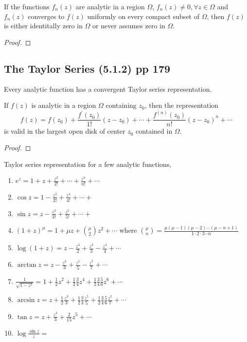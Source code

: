 \begin{theorem}[Hurwitz]
	If the functions $f_n(z)$ are analytic in a region $\Omega$, $f_n(z) \ne 0, \forall z \in \Omega$ and $f_n(z)$ converges to $f(z)$ uniformly on every compact subset of $\Omega$, then $f(z)$ is either identitally zero in $\Omega$ or never assumes zero in $\Omega$.
\end{theorem}
\begin{proof}
\end{proof}
	
\subsection{The Taylor Series (5.1.2) pp 179}
\begin{important}
	Every analytic function has a convergent Taylor series representation.
\end{important}
\begin{theorem}
	If $f(z)$ is analytic in a region $\Omega$ containing $z_0$, then the representation
	\begin{equation}
		f(z) = f(z_0) + \frac{f^\prime(z_0)}{1!}(z-z_0) + \dotsb + \frac{f^{(n)}(z_0)}{n!}(z-z_0)^n + \dotsb
	\end{equation}
	is valid in the largest open disk of center $z_0$ contained in $\Omega$.
\end{theorem}
\begin{proof}
\end{proof}

Taylor series representation for a few analytic functions,
\begin{enumerate}
	\item $e^z = 1 + z + \frac{z^2}{2!} + \dotsb + \frac{z^n}{n!} + \dotsb$
	\item $\cos z = 1 - \frac{z^2}{2!} + \frac{z^4}{4!} + \dotsb + $
	\item $\sin z = z - \frac{z^3}{3!} + \frac{z^5}{5!} + \dotsb + $
	\item $(1+z)^\mu = 1 + \mu z + \binom{\mu}{2} z^2 + \dotsb$ where $\binom{\mu}{n} = \frac{\mu(\mu-1)(\mu-2) \dotsm (\mu-n+1)}{1 \cdot 2 \cdot 3 \dotsm n}$
	\item $\log (1+z) = z - \frac{z^2}{2} + \frac{z^3}{3} - \frac{z^4}{4} + \dotsb$
	\item $\arctan z = z - \frac{z^3}{3} + \frac{z^5}{5} - \frac{z^7}{7} + \dotsb$
	\item $\frac{1}{\sqrt{1-z^2}} = 1 + \frac{1}{2}z^2 + \frac{1}{2}\frac{3}{4} z^4 + \frac{1}{2} \frac{3}{4} \frac{5}{6} z^6 + \dotsb$ 
	\item $\arcsin z = z + \frac{1}{2} \frac{z^3}{3} + \frac{1}{2} \frac{3}{4} \frac{z^5}{5} + \frac{1}{2} \frac{3}{4} \frac{5}{6} \frac{z^7}{7} + \dotsb$
	\item $\tan z = z + \frac{z^3}{3}+\frac{2}{15}z^5+\dotsb$
	\item $\log \frac{\sin z}{z} = $
\end{enumerate}

